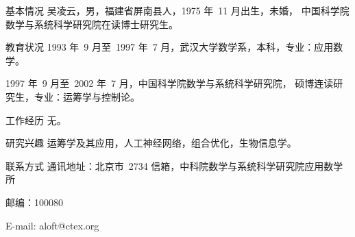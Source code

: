 ﻿
\begin{resume}

\begin{resumesection}{基本情况}
吴凌云，男，福建省屏南县人，1975 年~11 月出生，未婚，
中国科学院数学与系统科学研究院在读博士研究生。
\end{resumesection}

\begin{resumelist}{教育状况}
1993 年~9 月至~1997 年~7 月，武汉大学数学系，本科，专业：应用数学。

1997 年~9 月至~2002 年~7 月，中国科学院数学与系统科学研究院，
硕博连读研究生，专业：运筹学与控制论。
\end{resumelist}

\begin{resumelist}{工作经历}
无。
\end{resumelist}

\begin{resumelist}{研究兴趣}
运筹学及其应用，人工神经网络，组合优化，生物信息学。
\end{resumelist}

\begin{resumelist}{联系方式}
通讯地址：北京市~2734 信箱，中科院数学与系统科学研究院应用数学所

邮编：100080

E-mail: aloft@ctex.org
\end{resumelist}

\end{resume}
